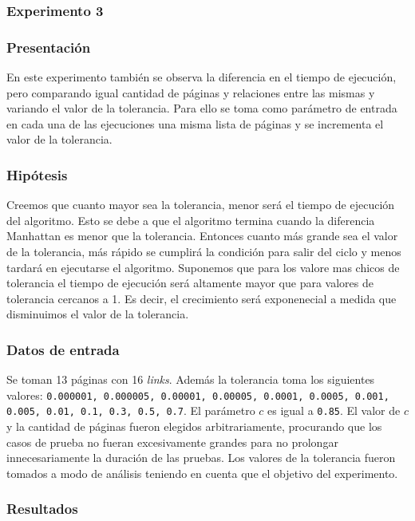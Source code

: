 		\subsubsection{Experimento 3}
			\subsubsection*{Presentación}
			En este experimento también se observa la diferencia en el tiempo de ejecución, pero comparando igual cantidad de páginas y relaciones entre las mismas y variando el valor de la tolerancia.
			Para ello se toma como parámetro de entrada en cada una de las ejecuciones una misma lista de páginas y se incrementa el valor de la tolerancia.

			\subsubsection*{Hipótesis} 
			Creemos que cuanto mayor sea la tolerancia, menor será el tiempo de ejecución del algoritmo. Esto se debe a que el algoritmo termina cuando la diferencia Manhattan es menor que la tolerancia. Entonces cuanto más grande sea el valor de la tolerancia, más rápido se cumplirá la condición para salir del ciclo y menos tardará en ejecutarse el algoritmo. Suponemos que para los valore mas chicos de tolerancia el tiempo de ejecución será altamente mayor que para valores de tolerancia cercanos a 1. Es decir, el crecimiento será exponenecial a medida que disminuimos el valor de la tolerancia.

			\subsubsection*{Datos de entrada} 
			Se toman 13 páginas con 16 \emph{links}. Además la tolerancia toma los siguientes valores: \texttt{0.000001, 0.000005, 0.00001, 0.00005, 0.0001, 0.0005, 0.001, 0.005, 0.01, 0.1, 0.3, 0.5, 0.7}. El parámetro $c$ es igual a \texttt{0.85}. El valor de $c$ y la cantidad de páginas fueron elegidos arbitrariamente, procurando que los casos de prueba no fueran excesivamente grandes para no prolongar innecesariamente la duración de las pruebas. Los valores de la tolerancia fueron tomados a modo de análisis teniendo en cuenta que el objetivo del experimento. 

			\subsubsection*{Resultados}
				{\centering \begin{tabular}{c}
			    \end{tabular}}

